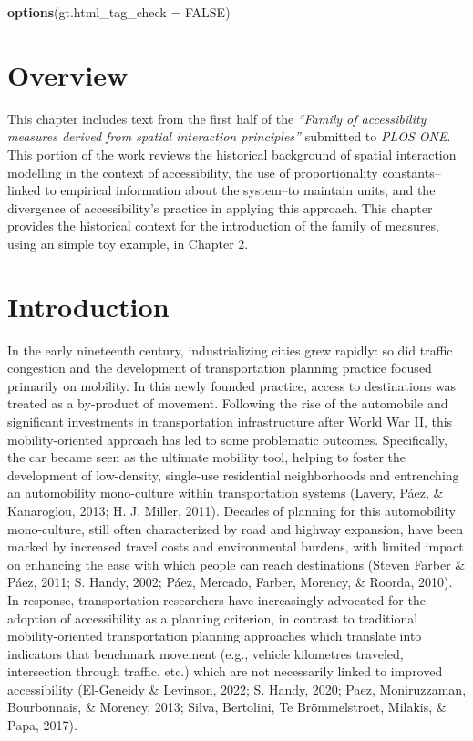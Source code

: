 \documentclass[
11pt, %
oneside, %
english, %
singlespacing, %
]{macthesis} %
\newenvironment{Shaded}{\begin{snugshade}}{\end{snugshade}}
\newcommand{\AttributeTok}[1]{\textcolor[rgb]{0.13,0.29,0.53}{#1}}
\newcommand{\ConstantTok}[1]{\textcolor[rgb]{0.56,0.35,0.01}{#1}}
\newcommand{\FunctionTok}[1]{\textcolor[rgb]{0.13,0.29,0.53}{\textbf{#1}}}
\newcommand{\NormalTok}[1]{#1}
\begin{document}
\begin{Shaded}
\begin{Highlighting}[]
\FunctionTok{options}\NormalTok{(}\AttributeTok{gt.html\_tag\_check =} \ConstantTok{FALSE}\NormalTok{)}
\end{Highlighting}
\end{Shaded}

\section{Overview}\label{overview}

This chapter includes text from the first half of the \emph{``Family of accessibility measures derived from spatial interaction principles''} submitted to \emph{PLOS ONE}. This portion of the work reviews the historical background of spatial interaction modelling in the context of accessibility, the use of proportionality constants--linked to empirical information about the system--to maintain units, and the divergence of accessibility's practice in applying this approach. This chapter provides the historical context for the introduction of the family of measures, using an simple toy example, in Chapter 2.

\section{Introduction}\label{introduction}

In the early nineteenth century, industrializing cities grew rapidly: so did traffic congestion and the development of transportation planning practice focused primarily on mobility. In this newly founded practice, access to destinations was treated as a by-product of movement. Following the rise of the automobile and significant investments in transportation infrastructure after World War II, this mobility-oriented approach has led to some problematic outcomes. Specifically, the car became seen as the ultimate mobility tool, helping to foster the development of low-density, single-use residential neighborhoods and entrenching an automobility mono-culture within transportation systems (Lavery, Páez, \& Kanaroglou, 2013; H. J. Miller, 2011). Decades of planning for this automobility mono-culture, still often characterized by road and highway expansion, have been marked by increased travel costs and environmental burdens, with limited impact on enhancing the ease with which people can reach destinations (Steven Farber \& Páez, 2011; S. Handy, 2002; Páez, Mercado, Farber, Morency, \& Roorda, 2010). In response, transportation researchers have increasingly advocated for the adoption of accessibility as a planning criterion, in contrast to traditional mobility-oriented transportation planning approaches which translate into indicators that benchmark movement (e.g., vehicle kilometres traveled, intersection through traffic, etc.) which are not necessarily linked to improved accessibility (El-Geneidy \& Levinson, 2022; S. Handy, 2020; Paez, Moniruzzaman, Bourbonnais, \& Morency, 2013; Silva, Bertolini, Te Brömmelstroet, Milakis, \& Papa, 2017).
\end{document}
